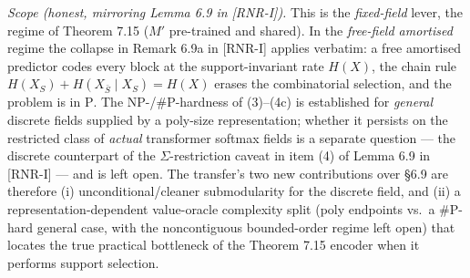 \documentclass[
]{article}
\begin{document}
\emph{Scope (honest, mirroring Lemma 6.9 in [RNR-I]).} This is the \emph{fixed-field}
lever, the regime of Theorem 7.15 ($M'$ pre-trained and shared). In the
\emph{free-field amortised} regime the collapse in Remark 6.9a
in [RNR-I] applies verbatim:
a free amortised predictor codes every block at the support-invariant rate
$H(X)$, the chain rule $H(X_S)+H(X_{\bar S}\mid X_S)=H(X)$ erases the
combinatorial selection, and the problem is in $\mathrm P$. The NP-/\#P-hardness
of (3)--(4c) is established for \emph{general} discrete fields supplied by a
poly-size representation; whether it persists on the restricted class of
\emph{actual} transformer softmax fields is a separate question --- the
discrete counterpart of the $\Sigma$-restriction caveat in item (4)
of Lemma 6.9 in [RNR-I] ---
and is left open. The transfer's two new contributions over §6.9 are
therefore (i) unconditional/cleaner submodularity for the discrete field, and
(ii) a representation-dependent value-oracle complexity split (poly endpoints
vs.\ a \#P-hard general case, with the noncontiguous bounded-order regime left
open) that locates the true practical bottleneck of the Theorem 7.15 encoder
when it performs support selection.
\end{document}
